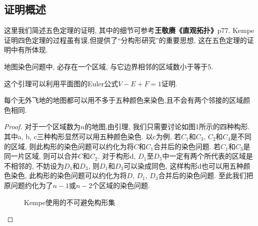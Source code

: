\documentclass[main]{subfiles}
\begin{document}
\subsection{证明概述}
这里我们简述五色定理的证明, 其中的细节可参考\textbf{王敬赓《直观拓扑》}p77. Kempe证明四色定理的过程虽有误,但提供了``分构形研究''的重要思想, 这在五色定理的证明中有所体现.
\begin{lemma}
	地图染色问题中, 必存在一个区域, 与它边界相邻的区域数小于等于5.
\end{lemma}
这个引理可以利用平面图的Euler公式$V-E+F=1$证明.
\begin{theorem}[五色定理]
	每个无外飞地的地图都可以用不多于五种颜色来染色,且不会有两个邻接的区域颜色相同.
\end{theorem}
\begin{proof}
	对于一个区域数为$n$的地图,由引理, 我们只需要讨论如图1所示的四种构形. 其中a, b, c三种构形显然可以用五种颜色染色. 以c为例, 若$C_1$和$C_3$, $C_2$和$C_4$是不同的区域, 则此构形的染色问题可以约化为将$C$和$C_1$合并后的染色问题. 若$C_1$和$C_3$是同一片区域, 则可以合并$C$和$C_2$. 对于构形d, $D_1$至$D_5$中一定有两个所代表的区域是不相邻的, 不妨设为$D_1$和$D_3$, 则$D_1$和$D_3$可以染成同色, 这样构形d也可以用五种颜色染色, 此构形的染色问题可以约化为将$D$, $D_1$, $D_3$合并后的染色问题. 至此我们把原问题约化为了$n-1$或$n-2$个区域的染色问题.
	\begin{figure}[h]
		\centering
		\caption{Kempe使用的不可避免构形集}
		\label{fig:subfig_1}
	\end{figure}
\end{proof}
\end{document}
